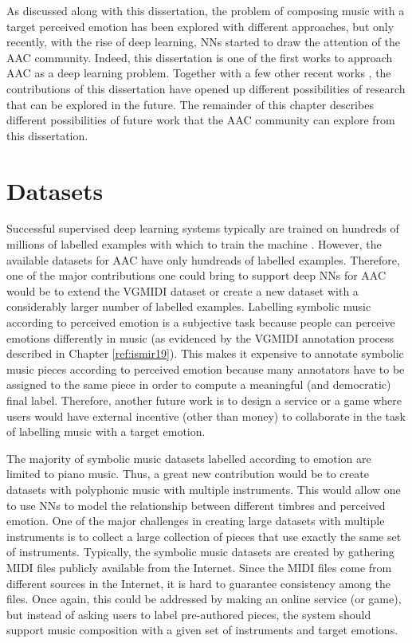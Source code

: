 As discussed along with this dissertation, the problem of composing music with a target perceived emotion has been explored with different approaches, but only recently, with the rise of deep learning, NNs started to draw the attention of the AAC community.  Indeed, this dissertation is one of the first works to approach AAC as a deep learning problem. Together with a few other recent works \cite{madhok2018sentimozart,tan2020automated,zhao2019emotional, tan2020music}, the contributions of this dissertation have opened up different possibilities of research that can be explored in the future. The remainder of this chapter describes different possibilities of future work that the AAC community can explore from this dissertation.

\section{Datasets}

Successful supervised deep learning systems typically are trained on hundreds of millions of labelled examples with which to train the machine \cite{lecun2015deep}. However, the available datasets for AAC have only hundreads of labelled examples. Therefore, one of the major contributions one could bring to support deep NNs for AAC would be to extend the VGMIDI dataset or create a new dataset with a considerably larger number of labelled examples. Labelling symbolic music according to perceived emotion is a subjective task because people can perceive emotions differently in music (as evidenced by the VGMIDI annotation process described in Chapter \ref{ref:ismir19}). This makes it expensive to annotate symbolic music pieces according to perceived emotion because many annotators have to be assigned to the same piece in order to compute a meaningful (and democratic) final label. Therefore, another future work is to design a service or a game \cite{Law2007TagATuneAG} where users would have external incentive (other than money) to collaborate in the task of labelling music with a target emotion.

The majority of symbolic music datasets labelled according to emotion are limited to piano music. Thus, a great new contribution would be to create datasets with polyphonic music with multiple instruments. This would allow one to use NNs to model the relationship between different timbres and perceived emotion. One of the major challenges in creating large datasets with multiple instruments is to collect a large collection of pieces that use exactly the same set of instruments. Typically, the symbolic music datasets are created by gathering MIDI files publicly available from the Internet.  Since the MIDI files come from different sources in the Internet, it is hard to guarantee consistency among the files. Once again, this could be addressed by making an online service (or game), but instead of asking users to label pre-authored pieces, the system should support music composition with a given set of instruments and target emotions.

